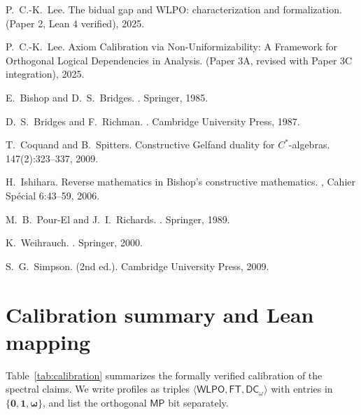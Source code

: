 \documentclass[11pt]{article}
\newcommand{\WLPO}{\mathsf{WLPO}}
\newcommand{\FT}{\mathsf{FT}}
\newcommand{\DCw}{\mathsf{DC}_{\omega}}
\newcommand{\MP}{\mathsf{MP}}
\newcommand{\hzero}{\mathbf{0}}
\newcommand{\hone}{\mathbf{1}}
\newcommand{\homega}{\boldsymbol{\omega}}
\theoremstyle{plain}
\theoremstyle{definition}
\theoremstyle{remark}
\begin{document}

\begin{thebibliography}{99}

P.~C.-K.~Lee.
\newblock The bidual gap and WLPO: characterization and formalization.
\newblock (Paper 2, Lean 4 verified), 2025.

P.~C.-K.~Lee.
\newblock Axiom Calibration via Non-Uniformizability: A Framework for Orthogonal Logical Dependencies in Analysis.
\newblock (Paper 3A, revised with Paper 3C integration), 2025.

E.~Bishop and D.~S.~Bridges.
.
\newblock Springer, 1985.

D.~S.~Bridges and F.~Richman.
.
\newblock Cambridge University Press, 1987.

T.~Coquand and B.~Spitters.
\newblock Constructive Gelfand duality for $C^*$-algebras.
 147(2):323--337, 2009.

H.~Ishihara.
\newblock Reverse mathematics in {B}ishop's constructive mathematics.
, Cahier Sp\'ecial 6:43--59, 2006.

M.~B.~Pour-El and J.~I.~Richards.
.
\newblock Springer, 1989.

K.~Weihrauch.
.
\newblock Springer, 2000.

S.~G.~Simpson.
 (2nd ed.).
\newblock Cambridge University Press, 2009.

\end{thebibliography}


\section{Calibration summary and Lean mapping}\label{sec:calibration-summary}
Table~\ref{tab:calibration} summarizes the formally verified calibration of the
spectral claims. We write profiles as triples \(\langle \WLPO,\FT,\DCw\rangle\) with
entries in \(\{\hzero,\hone,\homega\}\), and list the orthogonal \(\MP\) bit separately.
\end{document}
